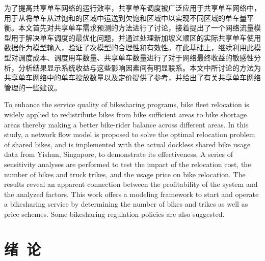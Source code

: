 \documentclass[]{tongjithesis}
\numberwithin{equation}{chapter}
\begin{document}
\begin{cabstract}
	为了提高共享单车网络的运行效率，共享单车调度被广泛应用于共享单车网络中，用于从将单车从过饱和的区域中运送到欠饱和区域中以实现不同区域的单车量平衡。本文首先对共享单车需求预测的方法进行了讨论，接着提出了一个网络流量模型用于解决单车调度的最优化问题，并通过处理新加坡义顺区的实际共享单车使用数据作为模型输入，验证了次模型的合理性和有效性。在此基础上，继续利用此模型对调度成本、调度用车数量、共享单车数量进行了对于网络最终收益的敏感性分析，分析结果显示系统收益与这些影响因素间有明显联系。本文中所讨论的方法为共享单车网络中的单车投放数量以及定价提供了参考，并给出了有关共享单车网络管理的一些建议。
\end{cabstract}

\begin{eabstract}
	To enhance the service quality of bikesharing programs, bike fleet relocation is widely applied to redistribute bikes from bike sufficient areas to bike shortage areas thereby making a better bike-rider balance across different areas. In this study, a network flow model is proposed to solve the optimal relocation problem of shared bikes, and is implemented with the actual dockless shared bike usage data from Yishun, Singapore, to demonstrate its effectiveness. A series of sensitivity analyses are performed to test the impact of the relocation cost, the number of bikes and truck trikes, and the usage price on bike relocation. The results reveal an apparent connection between the profitability of the system and the analyzed factors. This work offers a modeling framework to start and operate a bikesharing service by determining the number of bikes and trikes as well as price schemes. Some bikesharing regulation policies are also suggested.
\end{eabstract}

\toc

\mainmatter

\chapter{绪~论}
\end{document}
